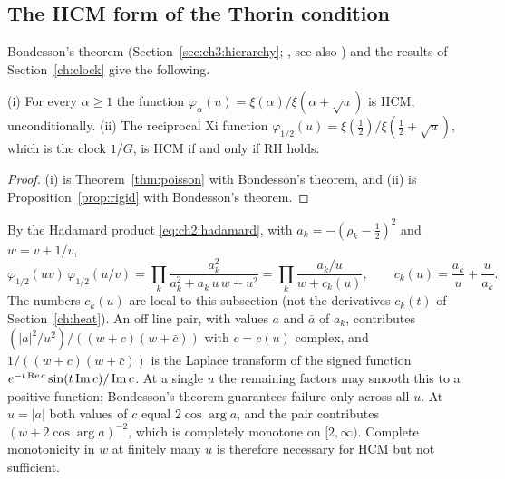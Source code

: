 \subsection{The HCM form of the Thorin condition}\label{sec:weak:hcm}

Bondesson's theorem (Section~\ref{sec:ch3:hierarchy}; \cite[Theorem 6.1.1]{Bondesson}, see also \cite{JRY}) and the results of Section~\ref{ch:clock} give the following.

\begin{corollary}\label{cor:hcm}
(i) For every $\alpha\ge1$ the function $\varphi_\alpha(u)=\xi(\alpha)/\xi(\alpha+\sqrt u)$ is HCM, unconditionally. (ii) The reciprocal Xi function $\varphi_{1/2}(u)=\xi(\tfrac12)/\xi(\tfrac12+\sqrt u)$, which is the clock $1/G$, is HCM if and only if RH holds.
\end{corollary}

\begin{proof}
(i) is Theorem~\ref{thm:poisson} with Bondesson's theorem, and (ii) is Proposition~\ref{prop:rigid} with Bondesson's theorem.
\end{proof}

By the Hadamard product \eqref{eq:ch2:hadamard}, with $a_k=-(\rho_k-\tfrac12)^2$ and $w=v+1/v$,
\begin{equation}\label{eq:hcmprod}
\varphi_{1/2}(uv)\,\varphi_{1/2}(u/v)=\prod_k\frac{a_k^2}{a_k^2+a_k\,u\,w+u^2}=\prod_k\frac{a_k/u}{w+c_k(u)},\qquad c_k(u)=\frac{a_k}{u}+\frac{u}{a_k}.
\end{equation}
The numbers $c_k(u)$ are local to this subsection (not the derivatives $c_k(t)$ of Section~\ref{ch:heat}). An off line pair, with values $a$ and $\bar a$ of $a_k$, contributes $(|a|^2/u^2)/((w+c)(w+\bar c))$ with $c=c(u)$ complex, and $1/((w+c)(w+\bar c))$ is the Laplace transform of the signed function $e^{-t\operatorname{Re} c}\sin(t\operatorname{Im} c)/\operatorname{Im} c$. At a single $u$ the remaining factors may smooth this to a positive function; Bondesson's theorem guarantees failure only across all $u$. At $u=|a|$ both values of $c$ equal $2\cos\arg a$, and the pair contributes $(w+2\cos\arg a)^{-2}$, which is completely monotone on $[2,\infty)$. Complete monotonicity in $w$ at finitely many $u$ is therefore necessary for HCM but not sufficient.

